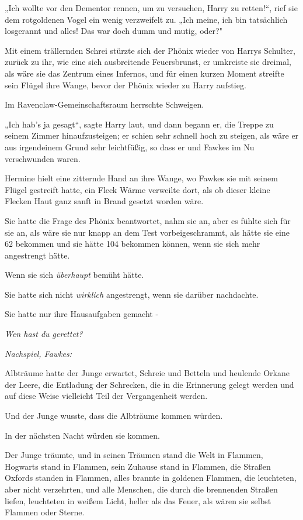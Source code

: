 {„Ich wollte vor den Dementor rennen, um zu versuchen, Harry zu retten!“, rief sie dem rotgoldenen Vogel ein wenig verzweifelt zu. „Ich meine, ich bin tatsächlich losgerannt und alles! Das war doch dumm und mutig, oder?"

Mit einem trällernden Schrei stürzte sich der Phönix wieder von Harrys Schulter, zurück zu ihr, wie eine sich ausbreitende Feuersbrunst, er umkreiste sie dreimal, als wäre sie das Zentrum eines Infernos, und für einen kurzen Moment streifte sein Flügel ihre Wange, bevor der Phönix wieder zu Harry aufstieg.

Im Ravenclaw-Gemeinschaftsraum herrschte Schweigen.

„Ich hab's ja gesagt“, sagte Harry laut, und dann begann er, die Treppe zu seinem Zimmer hinaufzusteigen; er schien sehr schnell hoch zu steigen, als wäre er aus irgendeinem Grund sehr leichtfüßig, so dass er und Fawkes im Nu verschwunden waren.

Hermine hielt eine zitternde Hand an ihre Wange, wo Fawkes sie mit seinem Flügel gestreift hatte, ein Fleck Wärme verweilte dort, als ob dieser kleine Flecken Haut ganz sanft in Brand gesetzt worden wäre.

Sie hatte die Frage des Phönix beantwortet, nahm sie an, aber es fühlte sich für sie an, als wäre sie nur knapp an dem Test vorbeigeschrammt, als hätte sie eine 62 bekommen und sie hätte 104 bekommen können, wenn sie sich mehr angestrengt hätte.

Wenn sie sich \emph{überhaupt} bemüht hätte.

Sie hatte sich nicht \emph{wirklich} angestrengt, wenn sie darüber nachdachte.

Sie hatte nur ihre Hausaufgaben gemacht -

\emph{\emph{Wen hast du gerettet?}}

\emph{\emph{Nachspiel, Fawkes:}}

Albträume hatte der Junge erwartet, Schreie und Betteln und heulende Orkane der Leere, die Entladung der Schrecken, die in die Erinnerung gelegt werden und auf diese Weise vielleicht Teil der Vergangenheit werden.

Und der Junge wusste, dass die Albträume kommen würden.

In der nächsten Nacht würden sie kommen.

Der Junge träumte, und in seinen Träumen stand die Welt in Flammen, Hogwarts stand in Flammen, sein Zuhause stand in Flammen, die Straßen Oxfords standen in Flammen, alles brannte in goldenen Flammen, die leuchteten, aber nicht verzehrten, und alle Menschen, die durch die brennenden Straßen liefen, leuchteten in weißem Licht, heller als das Feuer, als wären sie selbst Flammen oder Sterne.

}

